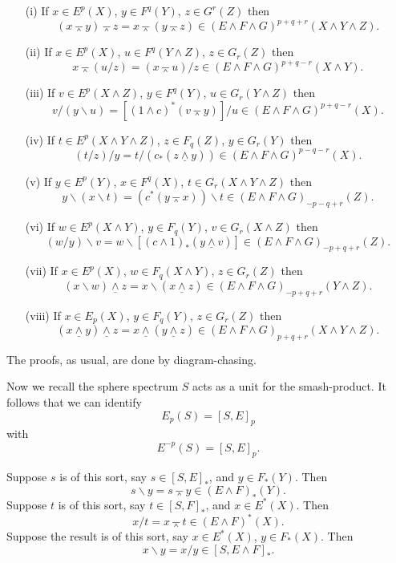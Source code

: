 \documentclass[../main]{subfiles}
\begin{document}
\begin{theorem}\label{thm:p3ch09.4}
\begin{enumerate}
    \item[(i)] If $x \in E^p(X)$, $y \in F^q(Y)$, $z \in G^r(Z)$ then \[(x \barwedge y) \barwedge z = x \barwedge (y \barwedge z) \in (E \wedge F \wedge G)^{p + q + r}(X \wedge Y \wedge Z).\]
    \item[(ii)] If $x \in E^p(X)$, $u \in F^q(Y \wedge Z)$, $z \in G_r(Z)$ then \[x \barwedge (u/z) = (x \barwedge u)/z \in (E \wedge F \wedge G)^{p + q - r}(X \wedge Y).\]
    \item[(iii)] If $v \in E^p(X \wedge Z)$, $y \in F^q(Y)$, $u \in G_r(Y \wedge Z)$ then \[v/(y \backslash u) = [(1 \wedge c)^\ast(v \barwedge y)]/u \in (E \wedge F \wedge G)^{p + q - r}(X).\]
    \item[(iv)] If $t \in E^p(X \wedge Y \wedge Z)$, $z \in F_q(Z)$, $y \in G_r(Y)$ then \[(t/z)/y = t/(c_\ast(z \underline \wedge y)) \in (E \wedge F \wedge G)^{p - q - r}(X).\]
    \item[(v)] If $y \in E^p(Y)$, $x \in F^q(X)$, $t \in G_r(X \wedge Y \wedge Z)$ then \[y \backslash (x \backslash t) = (c^\ast(y \barwedge x)) \backslash t \in (E \wedge F \wedge G)_{-p - q + r}(Z).\]
    \item[(vi)] If $w \in E^p(X \wedge Y)$, $y \in F_q(Y)$, $v \in G_r(X \wedge Z)$ then \[(w/y)\backslash v = w \backslash [(c \wedge 1)_\ast (y \underline \wedge v)] \in (E \wedge F \wedge G)_{-p + q + r}(Z).\]
    \item[(vii)] If $x \in E^p(X)$, $w \in F_q(X \wedge Y)$, $z \in G_r(Z)$ then \[(x \backslash w) \underline \wedge z = x \backslash (x \underline \wedge z) \in (E \wedge F \wedge G)_{-p + q + r}(Y \wedge Z).\]
    \item [(viii)] If $x \in E_p(X)$, $y \in F_q(Y)$, $z \in G_r(Z)$ then \[(x \underline \wedge y) \underline \wedge z = x \underline \wedge (y \underline \wedge z) \in (E \wedge F \wedge G)_{p + q + r}(X \wedge Y \wedge Z).\]
\end{enumerate}
\end{theorem}

The proofs, as usual, are done by diagram-chasing. 

Now we recall the sphere spectrum $S$ acts as a unit for the smash-product. It follows that we can identify \[E_p(S) = [S, E]_p\] with \[E^{-p}(S) = [S, E]_p.\]

\begin{proposition}\label{prop:p3ch09.5}
Suppose $s$ is of this sort, say $s \in [S, E]_\ast$, and $y \in F_\ast(Y)$. Then \[s \backslash y = s \barwedge y \in (E \wedge F)_\ast(Y).\] Suppose $t$ is of this sort, say $t \in [S, F]_\ast$, and $x \in E^\ast(X)$. Then \[x/t = x \barwedge t \in (E \wedge F)^\ast(X).\] Suppose the result is of this sort, say $x \in E^\ast(X)$, $y \in F_\ast(X)$. Then \[x \backslash y = x/y \in [S, E \wedge F]_\ast.\]
\end{proposition}
\end{document}
